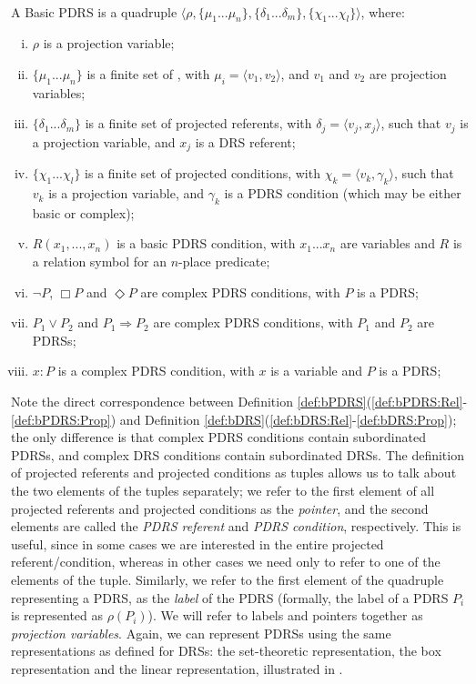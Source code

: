 \begin{definition} \label{def:bPDRS}~\\
A Basic PDRS is a quadruple $\langle \rho, \{\mu_1 ... \mu_n\}, 
\{\delta_1 ... \delta_m\}, \{\chi_1 ... \chi_l\}\rangle$, where:
  \begin{enumerate}[i.]
    \item $\rho$ is a projection variable;
    \item $\{\mu_1 ... \mu_n\}$ is a finite set of \MAPs, with $\mu_i=\langle
      v_1,v_2\rangle$, and  $v_1$ and $v_2$ are projection variables;
    \item $\{\delta_1 ... \delta_m\}$ is a finite set of projected
      referents, with $\delta_j=\langle v_j, x_j\rangle$, such that $v_j$ is
      a projection variable, and $x_j$ is a DRS referent;
    \item $\{\chi_1 ... \chi_l\}$ is a finite set of projected conditions,
      with $\chi_k = \langle v_k,\gamma_k\rangle$, such that $v_k$ is a
      projection variable, and $\gamma_k$ is a PDRS condition (which may be
      either basic or complex);
    \item \label{def:bPDRS:Rel} $R(x_1, ..., x_n)$ is a basic PDRS condition,
      with $x_1 ... x_n$ are variables and $R$ is a relation symbol for an
      $n$-place predicate;
    \item $\neg P$, $\Box P$ and $\Diamond P$ are complex PDRS conditions,
      with $P$ is a PDRS;
    \item $P_1 \vee P_2$ and $P_1 \Rightarrow P_2$ are complex PDRS
      conditions, with $P_1$ and $P_2$ are PDRSs;
    \item\label{def:bPDRS:Prop} $x:P$ is a complex PDRS condition, with $x$
      is a variable and $P$ is a PDRS;
  \end{enumerate}
\end{definition}

\noindent Note the direct correspondence between Definition
\ref{def:bPDRS}(\ref{def:bPDRS:Rel}-\ref{def:bPDRS:Prop}) and Definition
\ref{def:bDRS}(\ref{def:bDRS:Rel}-\ref{def:bDRS:Prop}); the only difference
is that complex PDRS conditions contain subordinated PDRSs, and complex DRS
conditions contain subordinated DRSs.  The definition of projected referents
and projected conditions as tuples allows us to talk about the two elements
of the tuples separately; we refer to the first element of all projected
referents and projected conditions as the \textit{pointer}, and the second
elements are called the \textit{PDRS referent} and \textit{PDRS condition},
respectively. This is useful, since in some cases we are interested in the
entire projected referent/condition, whereas in other cases we need only to
refer to one of the elements of the tuple. Similarly, we refer to the first
element of the quadruple representing a PDRS, as the \textit{label} of the
PDRS (formally, the label of a PDRS $P_i$ is represented as $\rho(P_i)$).
We will refer to labels and pointers together as \textit{projection
variables}.  Again, we can represent PDRSs using the same representations as
defined for DRSs: the set-theoretic representation, the box representation
and the linear representation, illustrated in \Next.

